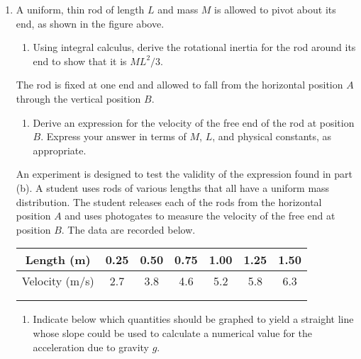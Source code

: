 \documentclass{../../../oss-classkick}
\begin{document}

\genfreedirections

\begin{center}
\end{center}
\begin{enumerate}
\item A uniform, thin rod of length $L$ and mass $M$ is allowed to pivot about
  its end, as shown in the figure above.
  \begin{enumerate}[leftmargin=15pt]
  \item Using integral calculus, derive the rotational inertia for the rod
    around its end to show that it is $ML^2/3$.
  \end{enumerate}
  \begin{center}
  \end{center}
  The rod is fixed at one end and allowed to fall from the horizontal
  position $A$ through the vertical position $B$.
  \begin{enumerate}[leftmargin=15pt,resume]
  \item Derive an expression for the velocity of the free end of the rod at
    position $B$. Express your answer in terms of $M$, $L$, and physical
    constants, as appropriate.
  \end{enumerate}
  \newpage
  An experiment is designed to test the validity of the expression found in
  part (b). A student uses rods of various lengths that all have a uniform
  mass distribution. The student releases each of the rods from the horizontal
  position $A$ and uses photogates to measure the velocity of the free end at
  position $B$. The data are recorded below.
  \begin{center}
    \def\arraystretch{1.45}
    \begin{tabular}{|c|c|c|c|c|c|c|}
      \hline
      Length (m)     & 0.25 & 0.50 & 0.75 & 1.00 & 1.25 & 1.50\\\hline
      Velocity (m/s) & 2.7  & 3.8  & 4.6  & 5.2  & 5.8  & 6.3 \\\hline
      & & & & & & \\\hline
      & & & & & & \\\hline
    \end{tabular}
    \def\arraystretch{1}
  \end{center}

  \begin{enumerate}[resume]
  \item Indicate below which quantities should be graphed to yield a straight
    line whose slope could be used to calculate a numerical value for the
    acceleration due to gravity $g$.


\end{enumerate}
\end{enumerate}
\end{document}
